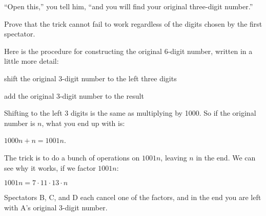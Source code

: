 \documentclass[fleqn,addpoints]{exam}
\begin{document}
\begin{questions}
``Open this,'' you tell him, ``and you will find your original three-digit number.''

Prove that the trick cannot fail to work regardless of the digits chosen by the first spectator.

\begin{solution}
Here is the procedure for constructing the original 6-digit number, written in a little more detail:
\begin{enumerate*}
  \item shift the original 3-digit number to the left three digits
  \item add the original 3-digit number to the result
\end{enumerate*}

Shifting to the left 3 digits is the same as multiplying by 1000.  So if the original number is $n$, what you end up
with is: 

\( 1000n + n  = 1001n \).

The trick is to do a bunch of operations on $1001n$, leaving $n$ in the end.  We can see why it works, if we factor
$1001n$:  

$1001n = 7 \cdot 11 \cdot 13 \cdot n$

Spectators B, C, and D each cancel one of the factors, and in the end you are
left with A's original 3-digit number.

\end{solution}

\end{questions}

\ifprintanswers
\end{document}
